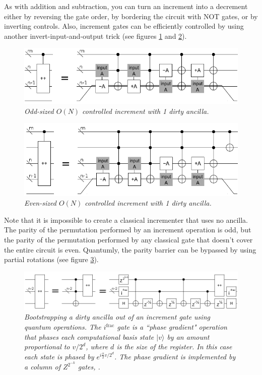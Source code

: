 \documentclass[twocolumn]{article}
\begin{document}
As with addition and subtraction, you can turn an increment into a decrement either by reversing the gate order, by bordering the circuit with NOT gates, or by inverting controls.
Also, increment gates can be efficiently controlled by using another invert-input-and-output trick (see figures \ref{fig:controlled-increment-odd} and \ref{fig:controlled-increment-even}).

\begin{figure}
  \centering
  \includegraphics[totalheight=2cm]{controlled-increment-odd.png}
  \caption{\em Odd-sized $O(N)$ controlled increment with 1 dirty ancilla.}
  \label{fig:controlled-increment-odd}
\end{figure}

\begin{figure}
  \centering
  \includegraphics[totalheight=2.5cm]{controlled-increment-even.png}
  \caption{\em Even-sized $O(N)$ controlled increment with 1 dirty ancilla.}
  \label{fig:controlled-increment-even}
\end{figure}

Note that it is impossible to create a classical incrementer that uses no ancilla.
The parity of the permutation performed by an increment operation is odd, but the parity of the permutation performed by any classical gate that doesn't cover the entire circuit is even.
Quantumly, the parity barrier can be bypassed by using partial rotations (see figure \ref{fig:bootstrap-ancilla}).

\begin{figure}
  \centering
  \includegraphics[totalheight=1.4cm]{ancilla-bootstrap.png}
  \caption{\em Bootstrapping a dirty ancilla out of an increment gate using quantum operations.
  The $i^{\text{frac}}$ gate is a ``phase gradient" operation that phases each computational basis state $|v\rangle$ by an amount proportional to $v/2^d$, where $d$ is the size of the register.
  In this case each state is phased by $e^{i \frac{\pi}{2} v/2^d}$.
  The phase gradient is implemented by a column of $Z^{2^{-k}}$ gates, .}
  \label{fig:bootstrap-ancilla}
\end{figure}
\end{document}
